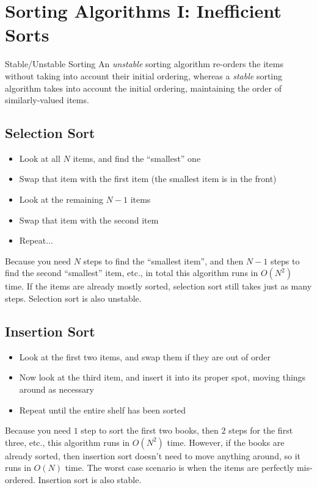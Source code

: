\documentclass[class=article, crop=false]{standalone}
\begin{document}
  \section{Sorting Algorithms I: Inefficient Sorts}
  \begin{definition}{Stable/Unstable Sorting}
    An \emph{unstable} sorting algorithm re-orders the items without taking into account their initial ordering, whereas a \emph{stable} sorting algorithm takes into account the initial ordering, maintaining the order of similarly-valued items.
  \end{definition}
  \subsection{Selection Sort}
  \begin{itemize}
    \item Look at all $N$ items, and find the ``smallest'' one
    \item Swap that item with the first item (the smallest item is in the front)
    \item Look at the remaining $N-1$ items
    \item Swap that item with the second item
    \item Repeat...
  \end{itemize}
  Because you need $N$ steps to find the ``smallest item'', and then $N-1$ steps to find the second ``smallest'' item, etc., in total this algorithm runs in $O(N^2)$ time. If the items are already mostly sorted, selection sort still takes just as many steps. Selection sort is also unstable.
  \subsection{Insertion Sort}
  \begin{itemize}
    \item Look at the first two items, and swap them if they are out of order
    \item Now look at the third item, and insert it into its proper spot, moving things around as necessary
    \item Repeat until the entire shelf has been sorted
  \end{itemize}
  Because you need $1$ step to sort the first two books, then $2$ steps for the first three, etc., this algorithm runs in $O(N^2)$ time. However, if the books are already sorted, then insertion sort doesn't need to move anything around, so it runs in $O(N)$ time. The worst case scenario is when the items are perfectly mis-ordered. Insertion sort is also stable.
\end{document}
